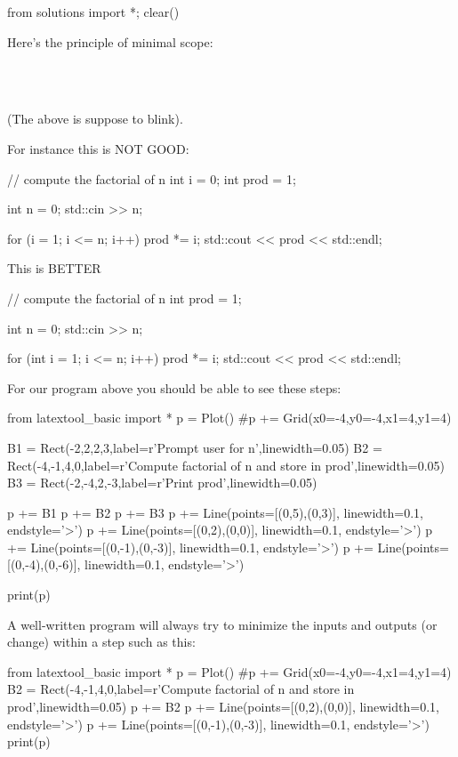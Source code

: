 \begin{python0}
from solutions import *; clear()
\end{python0}

Here's the principle of minimal scope:
\begin{center}
\\
\\
\end{center}

(The above is suppose to blink).

For instance this is NOT GOOD:
\begin{console}
// compute the factorial of n
int i = 0;
int prod = 1;

int n = 0;
std::cin >> n;

for (i = 1; i <= n; i++)
{
    prod *= i;
}
std::cout << prod << std::endl;
\end{console}

This is BETTER

\begin{console}
// compute the factorial of n
int prod = 1;

int n = 0;
std::cin >> n;

for (int i = 1; i <= n; i++)
{    
     prod *= i;
}
std::cout << prod << std::endl;
\end{console}

For our program above you should be able to see these steps:

\begin{python}
from latextool_basic import *
p = Plot()
#p += Grid(x0=-4,y0=-4,x1=4,y1=4)

B1 = Rect(-2,2,2,3,label=r'Prompt user for n',linewidth=0.05)
B2 = Rect(-4,-1,4,0,label=r'Compute factorial of n and store in prod',linewidth=0.05)
B3 = Rect(-2,-4,2,-3,label=r'Print prod',linewidth=0.05)

p += B1
p += B2
p += B3
p += Line(points=[(0,5),(0,3)], linewidth=0.1, endstyle='>')
p += Line(points=[(0,2),(0,0)], linewidth=0.1, endstyle='>')
p += Line(points=[(0,-1),(0,-3)], linewidth=0.1, endstyle='>')
p += Line(points=[(0,-4),(0,-6)], linewidth=0.1, endstyle='>')

print(p)
\end{python}

A well-written program will always try to minimize the inputs and
outputs (or change) within a step such as this:
\begin{python}
from latextool_basic import *
p = Plot()
#p += Grid(x0=-4,y0=-4,x1=4,y1=4)
B2 = Rect(-4,-1,4,0,label=r'Compute factorial of n and store in prod',linewidth=0.05)
p += B2
p += Line(points=[(0,2),(0,0)], linewidth=0.1, endstyle='>')
p += Line(points=[(0,-1),(0,-3)], linewidth=0.1, endstyle='>')
print(p)
\end{python}

